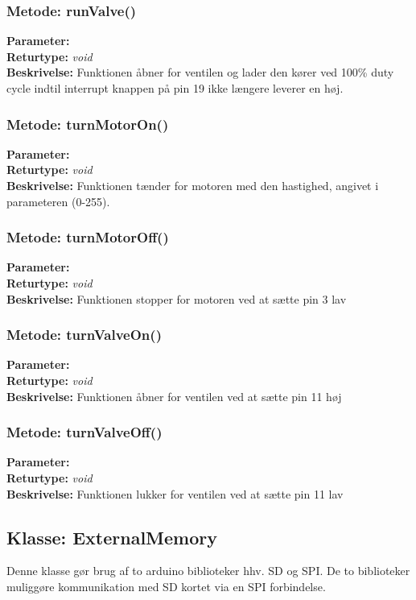 \subsubsection{Metode: runValve()}
\textbf{Parameter: } 
\\ \textbf{Returtype: } \textit{void}
\\ \textbf{Beskrivelse: }  Funktionen åbner for ventilen og lader den kører ved 100\% duty cycle indtil interrupt knappen på pin 19 ikke længere leverer en høj.

\subsubsection{Metode: turnMotorOn()}
\textbf{Parameter: } 
\\ \textbf{Returtype: } \textit{void}
\\ \textbf{Beskrivelse: } Funktionen tænder for motoren med den hastighed, angivet i parameteren (0-255).

\subsubsection{Metode: turnMotorOff()}
\textbf{Parameter: } 
\\ \textbf{Returtype: } \textit{void}
\\ \textbf{Beskrivelse: }   Funktionen stopper for motoren ved at sætte pin 3 lav

\subsubsection{Metode: turnValveOn()}
\textbf{Parameter: } 
\\ \textbf{Returtype: } \textit{void}
\\ \textbf{Beskrivelse: }  Funktionen åbner for ventilen ved at sætte pin 11 høj

\subsubsection{Metode: turnValveOff()}
\textbf{Parameter: } 
\\ \textbf{Returtype: } \textit{void}
\\ \textbf{Beskrivelse: }  Funktionen lukker for ventilen ved at sætte pin 11 lav

\subsection{Klasse: ExternalMemory}
Denne klasse gør brug af to arduino biblioteker hhv. SD og SPI.  De to biblioteker muliggøre kommunikation med SD kortet via en SPI forbindelse. 

